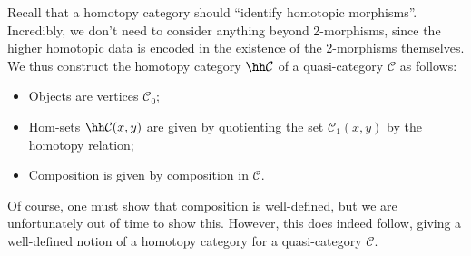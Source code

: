 Recall that a homotopy category should ``identify homotopic morphisms''. Incredibly, we don't need to consider anything beyond 2-morphisms, since the higher homotopic data is encoded in the existence of the 2-morphisms themselves. We thus construct the homotopy category $\hh \mathcal{C} $ of a quasi-category $\mathcal{C} $ as follows:
\begin{itemize}
	\item Objects are vertices $\mathcal{C} _0$;
	\item Hom-sets $\hh \mathcal{C} (x,y)$ are given by quotienting the set $\mathcal{C} _1(x,y)$ by the homotopy relation;
	\item Composition is given by composition in $\mathcal{C} $.
\end{itemize}
Of course, one must show that composition is well-defined, but we are unfortunately out of time to show this. However, this does indeed follow, giving a well-defined notion of a homotopy category for a quasi-category $\mathcal{C} $.
